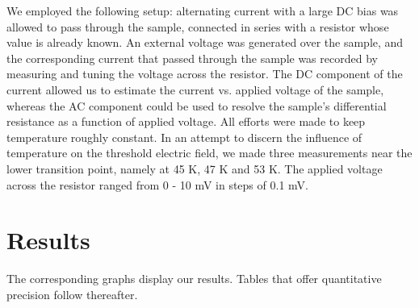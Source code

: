 \documentclass[aps,prl,nofootinbib,twocolumn,superscriptaddress,groupedaddress]{revtex4}  %
\begin{document}
We employed the following setup: alternating current with a large DC bias was allowed to pass through the sample, connected in series with a resistor whose value is already known. An external voltage was generated over the sample, and the corresponding current that passed through the sample was recorded by measuring and tuning the voltage across the resistor. The DC component of the current allowed us to estimate the current vs. applied voltage of the sample, whereas the AC component could be used to resolve the sample's differential resistance as a function of applied voltage. All efforts were made to keep temperature roughly constant. In an attempt to discern the influence of temperature on the threshold electric field, we made three measurements near the lower transition point, namely at 45 K, 47 K and 53 K. The applied voltage across the resistor ranged from 0 - 10 mV in steps of 0.1 mV. 

\section{Results}
The corresponding graphs display our results. Tables that offer quantitative precision follow thereafter.
\onecolumngrid
\end{document}
